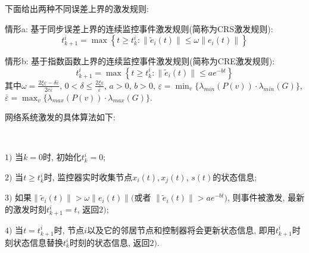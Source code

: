    下面给出两种不同误差上界的激发规则:

           情形a: 基于同步误差上界的连续监控事件激发规则(简称为CRS激发规则):
            \begin{equation}\label{crule:1}
            t^{i}_{k+1}=\max\left\{t\geq t^{i}_{k}: \|\tilde{e}_{i}(t)\| \leq\omega \| e_{i}(t)\|\right\}
            \end{equation}

            情形b: 基于指数函数上界的连续监控事件激发规则(简称为CRE激发规则):
            \begin{equation}\label{crule:2}
             t^{i}_{k+1}=\max\left\{t\geq t^{i}_{k}: \|\tilde{e}_{i}(t)\| \leq ae^{-bt}\right\}
             \end{equation}
           其中$\omega=\frac{2\xi\underline{\varepsilon}-\delta\bar{\varepsilon}}{2c\bar{\varepsilon}}$, $0<\delta\leq\frac{2\xi\underline{\varepsilon}}{\bar{\varepsilon}}$, $a>0$, $b>0$,
              $\underline{\varepsilon}=\min_{v}\{\lambda_{min}(P(v))\cdot\lambda_{min}(G)\}$, $\bar{\varepsilon}=\max_{v}\{\lambda_{max}(P(v))\cdot\lambda_{max}(G)\}$.

            网络系统激发的具体算法如下:
            \begin{algo}[连续监控事件激发算法]\label{algo1}~~

            $1)$ 当$k=0$时, 初始化$t^i_k=0$;

            $2)$ 当$t\geq t^i_k$时, 监控器实时收集节点$x_i(t),x_j(t)$, $s(t)$的状态信息;

            $3)$ 如果$\|\tilde{e}_{i}(t)\|>\omega \| e_{i}(t)\|($或者 $\|\tilde{e}_{i}(t)\| > ae^{-bt})$, 则事件被激发, 最新的激发时刻$t^i_{k+1}=t$, 返回$2)$;

            $4)$ 当$t=t^i_{k+1}$时, 节点$i$以及它的邻居节点和控制器将会更新状态信息, 即用$t_{k+1}^i$时刻状态信息替换$t^i_{k}$时刻的状态信息, 返回$2)$.
             \end{algo}


